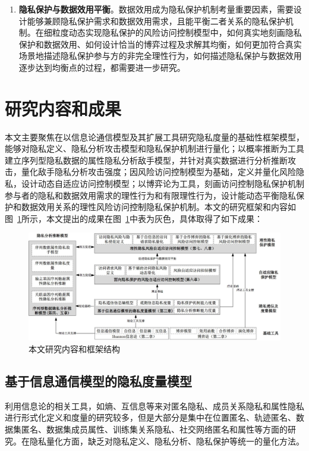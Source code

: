 \begin{enumerate}
	\item \textbf{隐私保护与数据效用平衡}。数据效用成为隐私保护机制考量重要因素，需要设计能够兼顾隐私保护需求和数据效用需求，且能平衡二者关系的隐私保护机制。在细粒度动态实现隐私保护的风险访问控制模型中，如何真实地刻画隐私保护和数据效用、如何设计恰当的博弈过程及求解其均衡，如何更加符合真实场景地描述隐私保护参与方的非完全理性行为，如何描述隐私保护与数据效用逐步达到均衡点的过程，都需要进一步研究。
\end{enumerate}

\section{研究内容和成果}

本文主要聚焦在以信息论通信模型及其扩展工具研究隐私度量的基础性框架模型，能够对隐私定义、隐私分析攻击模型和隐私保护机制进行量化；以概率推断为工具建立序列型隐私数据的属性隐私分析敌手模型，并针对真实数据进行分析推断攻击，量化敌手隐私分析攻击强度；因风险访问控制模型为基础，定义并量化风险隐私，设计动态自适应访问控制模型；以博弈论为工具，刻画访问控制隐私保护机制参与者的隐私和数据效用需求的理性行为和有限理性行为，设计能动态平衡隐私保护和数据效用关系的理性风险访问控制隐私保护机制。本文的研究框架和内容如图~\ref{fig:chapter1-research-framework}所示，本文提出的成果在图~\ref{fig:chapter1-research-framework}中表为灰色，具体取得了如下成果：

\begin{figure}[htbp]
	\centering
	\includegraphics[width = 0.99\linewidth]{./figures/chapter1-research-framework.jpg}
	\caption{本文研究内容和框架结构}
	\label{fig:chapter1-research-framework}
\end{figure}

\subsection{基于信息通信模型的隐私度量模型}
利用信息论的相关工具，如熵、互信息等来对匿名隐私、成员关系隐私和属性隐私进行形式化定义和度量的研究较多，但是大部分是集中在位置匿名、轨迹匿名、数据集匿名、数据集成员属性、训练集关系隐私、社交网络匿名和属性等方面的研究。在隐私量化方面，缺乏对隐私定义、隐私分析、隐私保护等统一的量化方法。

